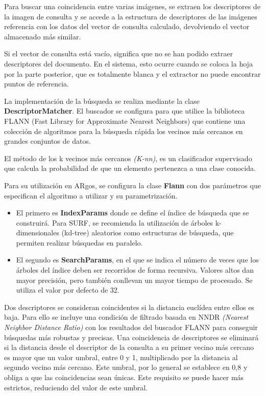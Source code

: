 Para buscar una coincidencia entre varias imágenes, se extraen los
descriptores de la imagen de consulta y se accede a la estructura de
descriptores de las imágenes referencia con los
datos del vector de consulta calculado, devolviendo el vector almacenado más
similar.

Si el vector de consulta está vacío, significa que no se han podido
extraer descriptores del documento. En el sistema, esto ocurre
cuando se coloca la hoja por la parte posterior, que es totalmente
blanca y el extractor no puede encontrar puntos de referencia.

La implementación de la búsqueda se realiza mediante la clase
\textbf{DescriptorMatcher}. El buscador se configura para que utilice
la biblioteca FLANN (Fast Library for Approximate Nearest Neighbors)
que contiene una colección de algoritmos para la búsqueda rápida los
vecinos más cercanos en grandes conjuntos de datos.

El método de los k vecinos más cercanos \emph{(K-nn)}, es un clasificador
supervisado que calcula la probabilidad de que un elemento pertenezca
a una clase conocida.

Para su utilización en ARgos, se configura la clase \textbf{Flann}
con dos parámetros que especifican el algoritmo a utilizar y su parametrización.

\begin{itemize}
\item El primero es \textbf{IndexParams} donde se define el índice de búsqueda
que se construirá. Para SURF, se recomienda la utilización de árboles
k-dimensionales (kd-tree) aleatorios como estructuras de búsqueda, que
permiten realizar búsquedas en paralelo.

\item El segundo es \textbf{SearchParams}, en el que se indica el número de
veces que los árboles del índice deben ser recorridos de forma
recursiva. Valores altos dan mayor precisión, pero también conllevan
un mayor tiempo de procesado. Se utiliza el valor por defecto de 32.
\end{itemize}

Dos descriptores se consideran coincidentes si la distancia euclídea
entre ellos es baja. Para ello se incluye una condición de filtrado
basada en NNDR \emph{(Nearest Neighbor Distance Ratio)} con los resultados
del buscador FLANN para conseguir búsquedas más robustas y
precisas. Una coincidencia de descriptores se eliminará si la
distancia desde el descriptor de la consulta a su primer vecino más
cercano es mayor que un valor umbral, entre 0 y 1, multiplicado por la
distancia al segundo vecino más cercano. Este umbral, por lo general
se establece en 0,8 y obliga a que las coincidencias sean únicas. Este
requisito se puede hacer más estrictos, reduciendo del valor de este
umbral.

